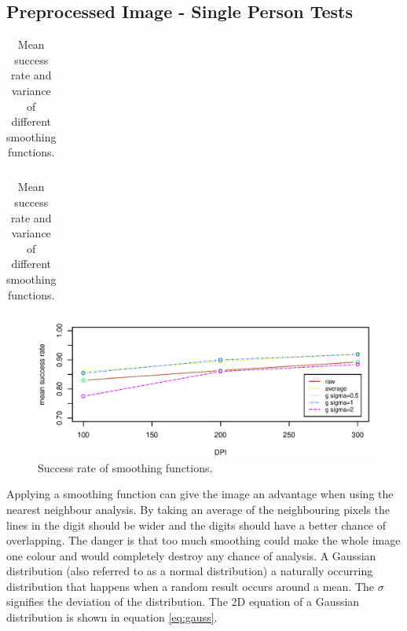 
\subsection{Preprocessed Image - Single Person Tests}

\begin{table}[h]
\centering
    \begin{subtable}[b]{0.56\textwidth}
    \centering
        \begin{tabular}{lcccccc}
            
        \end{tabular}
        \caption{Mean success rate.}
    \end{subtable}
    \begin{subtable}[b]{0.56\textwidth}
    \centering
        \begin{tabular}{lcccccc}
            
        \end{tabular}
        \caption{Variance in success rate.}
    \end{subtable}
    \caption[Success of smoothing functions.]{Mean success rate and variance of different smoothing functions.}
    \label{tb:smooth}
\end{table}

\begin{figure}[h]
\centering
\includegraphics[width=1\textwidth]{graphics/smoothing}
\caption{Success rate of smoothing functions.}
\label{fig:smooth}
\end{figure}

Applying a smoothing function can give the image an advantage when using the nearest neighbour analysis.
By taking an average of the neighbouring pixels the lines in the digit should be wider and the digits should have a better chance of overlapping.
The danger is that too much smoothing could make the whole image one colour and would completely destroy any chance of analysis.
A Gaussian distribution (also referred to as a normal distribution) a naturally occurring distribution that happens when a random result occurs around a mean. 
The $\sigma$ signifies the deviation of the distribution. 
The 2D equation of a Gaussian distribution is shown in equation \ref{eq:gauss}. 

